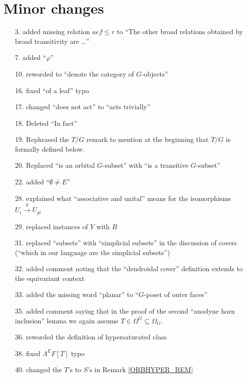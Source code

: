 \documentclass{article}
\begin{document}
\section{Minor changes}
 

\begin{itemize}
\item[3.] added missing relation $aef \leq r$ to ``The other broad relations obtained by broad transitivity are \dots''
\item[7.] added ``$\varphi$''
\item[10.] reworded to ``denote the category of $G$-objects''
\item[16.] fixed ``of a leaf'' typo
\item[17.] changed ``does not act'' to ``acts trivially''
\item[18.] Deleted ``In fact''
\item[19.] Rephrased the $T/G$ remark to mention at the beginning that $T/G$ is formally defined below.
\item[20.] Replaced ``is an orbital $G$-subset'' with ``is a transitive $G$-subset''
\item[22.] added ``$\emptyset \neq E$''
\item[28.] explained what ``associative and unital'' means for the isomorphisms $U_i \xrightarrow{g} U_{gi}$
\item[29.] replaced instances of $Y$ with $B$
\item[31.] replaced ``subsets'' with ``simplicial subsets'' in the discussion of covers (``which in our language are the simplicial subsets'')
\item[32.] added comment noting that the ``dendroidal cover'' definition extends to the equivariant context
\item[33.] added the missing word ``planar'' to ``$G$-poset of outer faces''
\item[35.] added comment saying that in the proof of the second ``anodyne horn inclusion'' lemma we again assume $T \in \Omega^G \subseteq \Omega_G$.
\item[36.] reworded the definition of hypersaturated class
\item[38.] fixed $\Lambda^EF[T]$ typo
\item[40.] changed the $T$'s to $S$'s in Remark \ref{ORBHYPER_REM} %

\end{itemize}
\end{document}
